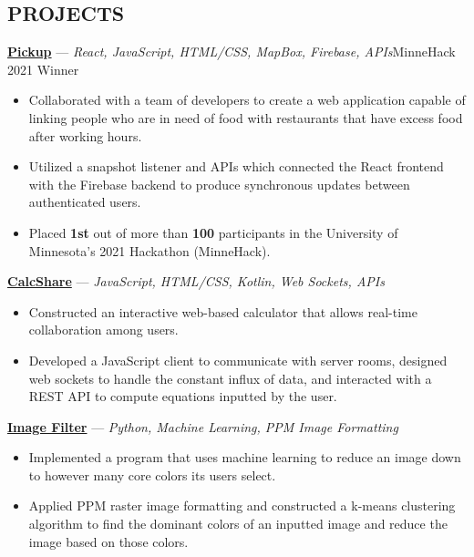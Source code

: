 \documentclass[11pt]{res}
\begin{document}
\begin{footnotesize}
\begin{resume}
\begin{small}
\section{PROJECTS}
\end{small} 
\vspace{.5mm}
\href{https://devpost.com/software/pickup-7b8yhx}{\textbf{Pickup}} — {\sl React, JavaScript, HTML/CSS, MapBox, Firebase, APIs}\hfill MinneHack 2021 Winner\vspace{-4.5mm}
\begin{itemize}[leftmargin=6.25mm] \itemsep -2pt 
\item Collaborated with a team of developers to create a web application capable of linking people who are in need of food with restaurants that have excess food after working hours.
\vspace{1.30mm}
\item Utilized a snapshot listener and APIs which connected the React frontend with the Firebase backend to produce synchronous updates between authenticated users. 
\vspace{1.30mm}
\item Placed \textbf{1st} out of more than \textbf{100} participants in the University of Minnesota's 2021 Hackathon (MinneHack). 
\end{itemize}
\vspace{-2.5mm}
\href{https://github.com/CharlesShi12/CalcShare}{\textbf{CalcShare}} — {\sl JavaScript, HTML/CSS, Kotlin, Web Sockets, APIs} \vspace{-4.5mm}
\begin{itemize}[leftmargin=6.25mm] \itemsep -2pt 
\item Constructed an interactive web-based calculator that allows real-time collaboration among users. 
\vspace{1.30mm}
\item Developed a JavaScript client to communicate with server rooms, designed web sockets to handle the constant influx of data, and interacted with a REST API to compute equations inputted by the user. 
\end{itemize}
\vspace{-2.5mm}
\href{https://github.com/CharlesShi12/ImageFilters}{\textbf{Image Filter}} — {\sl Python, Machine Learning, PPM Image Formatting} \vspace{-4.5mm}
\begin{itemize}[leftmargin=6.25mm] \itemsep -2pt 
\item Implemented a program that uses machine learning to reduce an image down to however many core colors its users select.
\vspace{1.30mm}
\item Applied PPM raster image formatting and constructed a k-means clustering algorithm to find the dominant colors of an inputted image and reduce the image based on those colors. 
\end{itemize}
\begin{small}

\end{small}
\end{resume}
\end{footnotesize}
\end{document}
